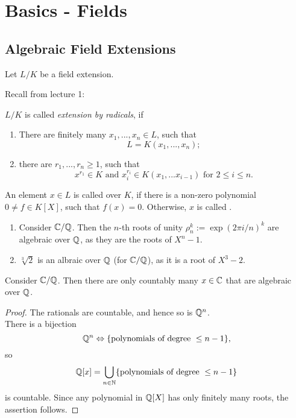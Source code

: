 \chapter{Basics - Fields}
\section{Algebraic Field Extensions}
Let $L/K$ be a field extension. \par
Recall from lecture 1:
\begin{defn}
  $L/K$ is called \emph{extension by radicals}, if
  \begin{enumerate}
    \item There are finitely many $x_1,...,x_n\in L$, such that
    \[
    L=K(x_1,...,x_n);
    \]
    \item there are $r_1,...,r_n\geq 1$, such that
    \[
    x^{r_1}\in K\text{ and }x_i^{r_i}\in K(x_1,...x_{i-1})\text{ for }2\leq i\leq n.
    \]
  \end{enumerate}
\end{defn}
\begin{defn}
  An element $x\in L$ is called  over $K$, if there is a non-zero polynomial $0\neq f\in K[X]$, such that $f(x)=0$. Otherwise, $x$ is called .
\end{defn}
\begin{bsp}
  \begin{enumerate}
    \item Consider $\mathbb{C}/\mathbb{Q}$. Then the $n$-th roots of unity $\rho_n^k:=\exp(2\pi i/n)^k$ are algebraic over $\mathbb{Q}$, as they are the roots of $X^n-1$.
    \item $\sqrt[3]{2}$ is an albraic over $\mathbb{Q}$ (for $\mathbb{C}/\mathbb{Q}$), as it is a root of $X^3-2$.
  \end{enumerate}
\end{bsp}
\begin{prop}
  Consider $\mathbb{C}/\mathbb{Q}$. Then there are only countably many $x\in \mathbb{C}$ that are algebraic over $\mathbb{Q}$.
\end{prop}
\begin{proof}
  The rationals are countable, and hence so is $\mathbb{Q}^n$.\\
  There is a bijection
  \[
  \mathbb{Q}^n \Leftrightarrow \{\text{polynomials of degree }\leq n-1\},
  \]
  so
  \[
  \mathbb{Q}[x]=\bigcup_{n\in \mathbb{N}} \{\text{polynomials of degree }\leq n-1\}
  \]
  is countable. Since any polynomial in $\mathbb{Q}[X]$ has only finitely many roots, the assertion follows.
\end{proof}
